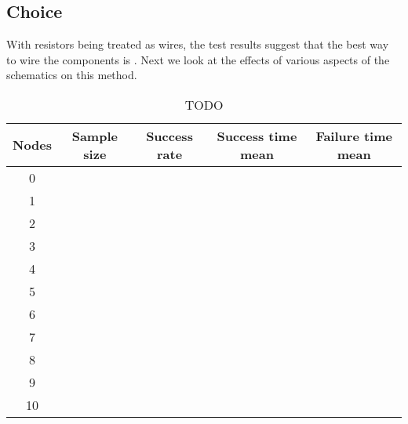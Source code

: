 \subsection{Choice}

With resistors being treated as wires, the test results suggest that the best
way to wire the components is \q. Next we look at the effects of various aspects
of the schematics on this method.

\begin{table}[H]
\begin{center}
\begin{singlespace}
\begin{tabular}{| c | c | c | c | c |}
\hline
Nodes & Sample size & Success rate & Success time mean & Failure time mean\\
\hline\hline
0 & & & & \\
1 & & & & \\
2 & & & & \\
3 & & & & \\
4 & & & & \\
5 & & & & \\
6 & & & & \\
7 & & & & \\
8 & & & & \\
9 & & & & \\
10 & & & & \\
\hline
\end{tabular}
\end{singlespace}
\end{center}
\label{tb:TODO}
\caption{TODO}
\end{table}

